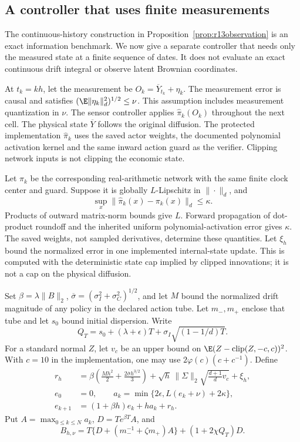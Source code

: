 \subsection{A controller that uses finite measurements}\label{sec:r13sensing}
The continuous-history construction in Proposition~\ref{prop:r13observation} is an exact information benchmark. We now give a separate controller that needs only the measured state at a finite sequence of dates. It does not evaluate an exact continuous drift integral or observe latent Brownian coordinates.

At $t_k=kh$, let the measurement be $O_k=\overline Y_{t_k}+\eta_k$. The measurement error is causal and satisfies $(\E\|\eta_k\|_d^2)^{1/2}\leq\nu$. This assumption includes measurement quantization in $\nu$. The sensor controller applies $\widehat\pi_k(O_k)$ throughout the next cell. The physical state $\overline Y$ follows the original diffusion. The protected implementation $\widehat\pi_k$ uses the saved actor weights, the documented polynomial activation kernel and the same inward action guard as the verifier. Clipping network inputs is not clipping the economic state.

Let $\pi_k$ be the corresponding real-arithmetic network with the same finite clock center and guard. Suppose it is globally $L$-Lipschitz in $\|\cdot\|_d$, and
\[
 \sup_x\|\widehat\pi_k(x)-\pi_k(x)\|_d\leq\kappa.
\]
Products of outward matrix-norm bounds give $L$. Forward propagation of dot-product roundoff and the inherited uniform polynomial-activation error gives $\kappa$. The saved weights, not sampled derivatives, determine these quantities. Let $\xi_h$ bound the normalized error in one implemented internal-state update. This is computed with the deterministic state cap implied by clipped innovations; it is not a cap on the physical diffusion.

Set $\beta=\lambda\|B\|_2$, $\overline\sigma=(\sigma_I^2+\sigma_C^2)^{1/2}$, and let $M$ bound the normalized drift magnitude of any policy in the declared action tube. Let $m_-,m_+$ enclose that tube and let $s_0$ bound initial dispersion. Write
\[
 Q_T=s_0+(\lambda+\epsilon)T
          +\sigma_I\sqrt{(1-1/d)T}.
\]
For a standard normal $Z$, let $v_c$ be an upper bound on $\E(Z-\operatorname{clip}(Z,-c,c))^2$. With $c=10$ in the implementation, one may use $2\varphi(c)(c+c^{-1})$. Define
\begin{align*}
 r_h&=\beta\left(\frac{Mh^2}{2}
                  +\frac{2\overline\sigma h^{3/2}}{3}\right)
       +\sqrt h\,\|\Sigma\|_2\sqrt{\frac{d+1}{d}v_c}+\xi_h,\\
 e_0&=0,\qquad
 a_k=\min\{2\epsilon,L(e_k+\nu)+2\kappa\},\\
 e_{k+1}&=(1+\beta h)e_k+h a_k+r_h.
\end{align*}
Put $A=\max_{0\leq k\leq N}a_k$, $D=T e^{\beta T}A$, and
\begin{equation}\label{eq:r13sensor}
 B_{h,\nu}=T\{D+(m_-^{-1}+\zeta m_+)A\}
                  +(1+2\chi Q_T)D.
\end{equation}

